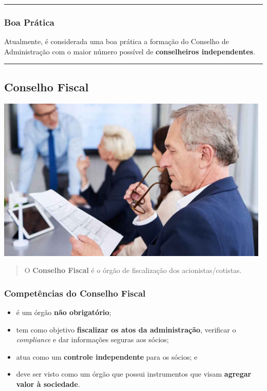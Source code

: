 \documentclass[
]{book}
\providecommand{\tightlist}{%
  \setlength{\itemsep}{0pt}\setlength{\parskip}{0pt}}
\begin{document}
\begin{center}\rule{0.5\linewidth}{0.5pt}\end{center}

\subsubsection{Boa Prática}\label{boa-pruxe1tica}

Atualmente, é considerada uma boa prática a formação do Conselho de Administração com o maior número possível de \textbf{conselheiros independentes}.

\begin{center}\rule{0.5\linewidth}{0.5pt}\end{center}

\subsection{Conselho Fiscal}\label{conselho-fiscal}

\includegraphics[width=5.15625in,height=\textheight]{images/04-2025-08-26_27/02-conselho_fiscal.jpg}

\begin{quote}
O \textbf{Conselho Fiscal} é o órgão de fiscalização dos acionistas/cotistas.
\end{quote}

\subsubsection{Competências do Conselho Fiscal}\label{competuxeancias-do-conselho-fiscal}

\begin{itemize}
\tightlist
\item
  é um órgão \textbf{não obrigatório};
\item
  tem como objetivo \textbf{fiscalizar os atos da administração}, verificar o \emph{compliance} e dar informações seguras aos sócios;
\item
  atua como um \textbf{controle independente} para os sócios; e
\item
  deve ser visto como um órgão que possui instrumentos que visam \textbf{agregar valor à sociedade}.
\end{itemize}
\end{document}
